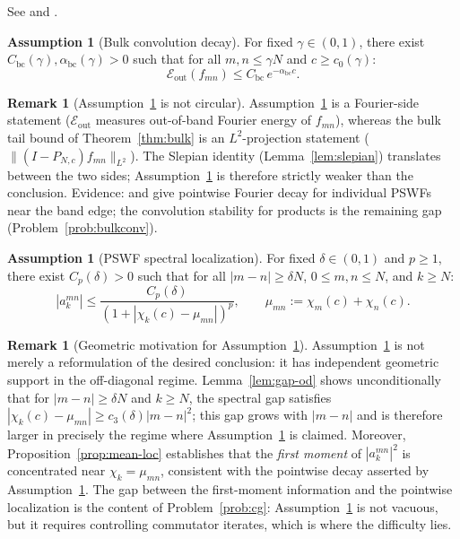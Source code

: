\documentclass[12pt,a4paper]{amsart}
\theoremstyle{definition}
\newtheorem{remark}[theorem]{Remark}
\newtheorem{assumption}[theorem]{Assumption}
\newcommand{\PN}{P_{N,c}}
\newcommand{\Eout}{\mathcal{E}_{\mathrm{out}}}
\newcommand{\mumN}{\mu_{mn}}
\begin{document}
See \cite[Thm.~1]{Widom1964} and \cite[Ch.~4]{OsipovRokhlinXiao}.

\begin{assumption}[Bulk convolution decay]\label{ass:bulkconv}
For fixed $\gamma\in(0,1)$, there exist
$C_{\mathrm{bc}}(\gamma),\alpha_{\mathrm{bc}}(\gamma)>0$ such that
for all $m,n\le\gamma N$ and $c\ge c_0(\gamma)$:
\[
  \Eout(f_{mn}) \le C_{\mathrm{bc}}\,e^{-\alpha_{\mathrm{bc}}c}.
\]
\end{assumption}

\begin{remark}[Assumption~\ref{ass:bulkconv} is not circular]
\label{rem:bulkconv-not-circular}
Assumption~\ref{ass:bulkconv} is a Fourier-side statement
($\Eout$ measures out-of-band Fourier energy of $f_{mn}$),
whereas the bulk tail bound of Theorem~\ref{thm:bulk} is an
$L^2$-projection statement ($\|(I-\PN)f_{mn}\|_{L^2}$).
The Slepian identity (Lemma~\ref{lem:slepian}) translates between
the two sides; Assumption~\ref{ass:bulkconv} is therefore
strictly weaker than the conclusion.
Evidence: \cite[Ch.~6]{OsipovRokhlinXiao} and
\cite[Eq.~(4.3)]{Slepian1978} give pointwise Fourier decay for
individual PSWFs near the band edge; the convolution stability
for products is the remaining gap (Problem~\ref{prob:bulkconv}).
\end{remark}

\begin{assumption}[PSWF spectral localization]\label{ass:specloc}
For fixed $\delta\in(0,1)$ and $p\ge 1$, there exist $C_p(\delta)>0$
such that for all $|m-n|\ge\delta N$, $0\le m,n\le N$, and $k\ge N$:
\begin{equation}\label{eq:specloc}
  |a_k^{mn}|
  \le \frac{C_p(\delta)}{(1+|\chi_k(c)-\mumN|)^p},
  \qquad \mumN := \chi_m(c)+\chi_n(c).
\end{equation}
\end{assumption}

\begin{remark}[Geometric motivation for Assumption~\ref{ass:specloc}]
\label{rem:specloc-geometric}
Assumption~\ref{ass:specloc} is not merely a reformulation of the
desired conclusion: it has independent geometric support in the
off-diagonal regime.
Lemma~\ref{lem:gap-od} shows unconditionally that for $|m-n|\ge\delta N$
and $k\ge N$, the spectral gap satisfies
$|\chi_k(c)-\mumN|\ge c_3(\delta)|m-n|^2$;
this gap grows with $|m-n|$ and is therefore larger in precisely
the regime where Assumption~\ref{ass:specloc} is claimed.
Moreover, Proposition~\ref{prop:mean-loc} establishes that the
\emph{first moment} of $|a_k^{mn}|^2$ is concentrated near
$\chi_k = \mumN$, consistent with the pointwise decay asserted by
Assumption~\ref{ass:specloc}.
The gap between the first-moment information and the pointwise
localization is the content of Problem~\ref{prob:cg}:
Assumption~\ref{ass:specloc} is not vacuous, but it requires
controlling commutator iterates, which is where the difficulty lies.
\end{remark}
\end{document}

